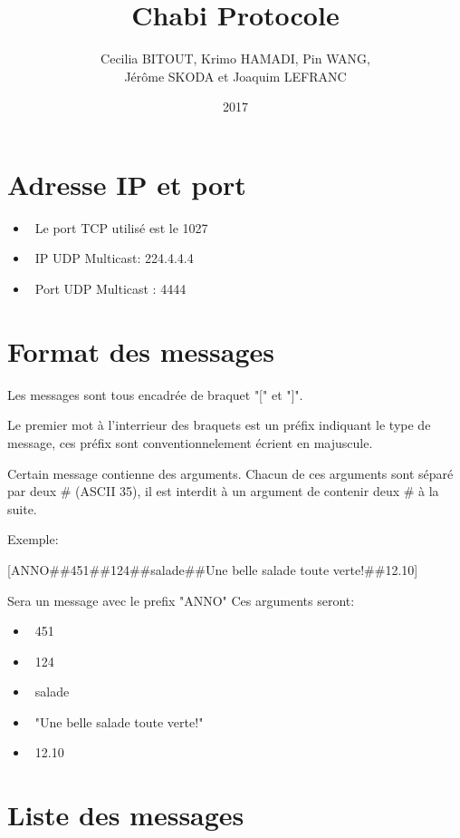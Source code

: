 \documentclass[12pt]{article}
\title{Chabi Protocole}
\author{
  Cecilia BITOUT, Krimo HAMADI, Pin WANG, \\
  Jérôme SKODA et Joaquim LEFRANC
}
\date{2017}
\begin{document}
\maketitle

\section{Adresse IP et port}

\begin{itemize}
  \item~Le port TCP utilisé est le 1027
  \item~IP UDP Multicast: 224.4.4.4
  \item~Port UDP Multicast : 4444
\end{itemize}


\section{Format des messages}

Les messages sont tous encadrée de braquet "[" et "]".

Le premier mot à l'interrieur des braquets est un préfix indiquant le type de message, ces préfix sont conventionnelement écrient en majuscule.

Certain message contienne des arguments. Chacun de ces arguments sont séparé par deux \# (ASCII 35), 
il est interdit à un argument de contenir deux \# à la suite.

Exemple: 

[ANNO\#\#451\#\#124\#\#salade\#\#Une belle salade toute verte!\#\#12.10] 

Sera un message avec le prefix "ANNO"
Ces arguments seront:
\begin{itemize}
  \item~451
  \item~124
  \item~salade
  \item~"Une belle salade toute verte!"
  \item~12.10
\end{itemize}

\section{Liste des messages}
\end{document}
